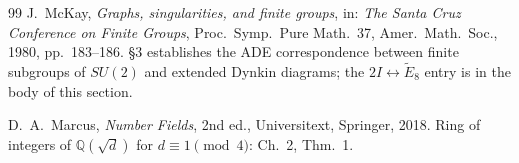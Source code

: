 \documentclass[11pt, a4paper]{amsart}
\theoremstyle{definition}
\newcommand{\Q}{\mathbb{Q}}
\begin{document}
\begin{thebibliography}{99}
J.~McKay, \emph{Graphs, singularities, and finite groups},
in: \emph{The Santa Cruz Conference on Finite Groups},
Proc.~Symp.~Pure Math.~37, Amer.~Math.~Soc., 1980,
pp.~183--186. \S 3 establishes the ADE correspondence
between finite subgroups of $SU(2)$ and extended Dynkin
diagrams; the $2I \leftrightarrow \widetilde E_8$ entry is
in the body of this section.

D.~A.~Marcus, \emph{Number Fields}, 2nd ed., Universitext,
Springer, 2018. Ring of integers of $\Q(\sqrt d)$ for
$d \equiv 1 \pmod 4$: Ch.~2, Thm.~1.

\end{thebibliography}
\end{document}
